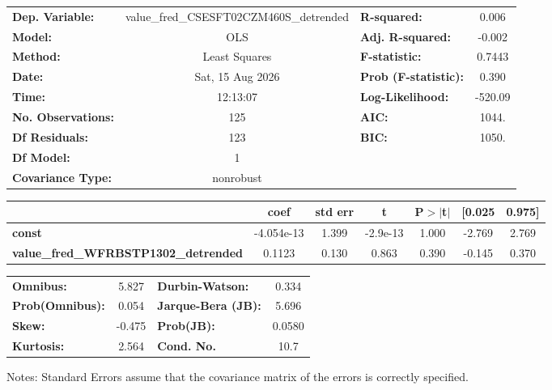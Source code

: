 \begin{center}
\begin{tabular}{lclc}
\toprule
\textbf{Dep. Variable:}                      & value\_fred\_CSESFT02CZM460S\_detrended & \textbf{  R-squared:         } &     0.006   \\
\textbf{Model:}                              &                   OLS                   & \textbf{  Adj. R-squared:    } &    -0.002   \\
\textbf{Method:}                             &              Least Squares              & \textbf{  F-statistic:       } &    0.7443   \\
\textbf{Date:}                               &             Sat, 15 Aug 2026            & \textbf{  Prob (F-statistic):} &    0.390    \\
\textbf{Time:}                               &                 12:13:07                & \textbf{  Log-Likelihood:    } &   -520.09   \\
\textbf{No. Observations:}                   &                     125                 & \textbf{  AIC:               } &     1044.   \\
\textbf{Df Residuals:}                       &                     123                 & \textbf{  BIC:               } &     1050.   \\
\textbf{Df Model:}                           &                       1                 & \textbf{                     } &             \\
\textbf{Covariance Type:}                    &                nonrobust                & \textbf{                     } &             \\
\bottomrule
\end{tabular}
\begin{tabular}{lcccccc}
                                             & \textbf{coef} & \textbf{std err} & \textbf{t} & \textbf{P$> |$t$|$} & \textbf{[0.025} & \textbf{0.975]}  \\
\midrule
\textbf{const}                               &   -4.054e-13  &        1.399     &  -2.9e-13  &         1.000        &       -2.769    &        2.769     \\
\textbf{value\_fred\_WFRBSTP1302\_detrended} &       0.1123  &        0.130     &     0.863  &         0.390        &       -0.145    &        0.370     \\
\bottomrule
\end{tabular}
\begin{tabular}{lclc}
\textbf{Omnibus:}       &  5.827 & \textbf{  Durbin-Watson:     } &    0.334  \\
\textbf{Prob(Omnibus):} &  0.054 & \textbf{  Jarque-Bera (JB):  } &    5.696  \\
\textbf{Skew:}          & -0.475 & \textbf{  Prob(JB):          } &   0.0580  \\
\textbf{Kurtosis:}      &  2.564 & \textbf{  Cond. No.          } &     10.7  \\
\bottomrule
\end{tabular}
\end{center}

Notes: \newline
 [1] Standard Errors assume that the covariance matrix of the errors is correctly specified.